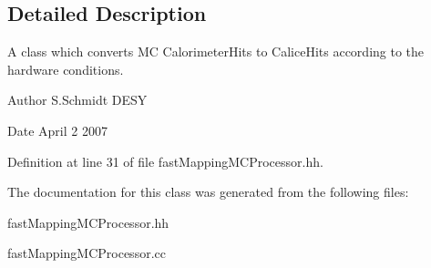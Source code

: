 \subsection{Detailed Description}
A class which converts M\-C Calorimeter\-Hits to Calice\-Hits according to the hardware conditions. 

\begin{DoxyAuthor}{Author}
S.\-Schmidt D\-E\-S\-Y 
\end{DoxyAuthor}
\begin{DoxyDate}{Date}
April 2 2007 
\end{DoxyDate}


Definition at line 31 of file fast\-Mapping\-M\-C\-Processor.\-hh.



The documentation for this class was generated from the following files\-:\begin{DoxyCompactItemize}
\item 
fast\-Mapping\-M\-C\-Processor.\-hh\item 
fast\-Mapping\-M\-C\-Processor.\-cc\end{DoxyCompactItemize}
